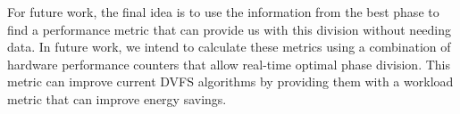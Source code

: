 For future work, the final idea is to use the information from the best phase to find a performance metric that can provide us with this division without needing data. In future work, we intend to calculate these metrics using a combination of hardware performance counters that allow real-time optimal phase division. This metric can improve current DVFS algorithms by providing them with a workload metric that can improve energy savings.

